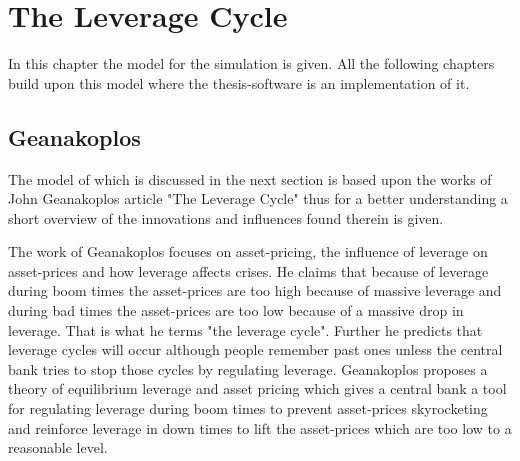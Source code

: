 \documentclass[../Bachelorarbeit.tex]{subfiles}
\begin{document}
\chapter{The Leverage Cycle}
\label{ch:leverageCycle}

In this chapter the model for the simulation is given. All the following chapters build upon this model where the thesis-software is an implementation of it. 

\section{Geanakoplos}
The model of \cite{Breuer2015} which is discussed in the next section is based upon the works of John Geanakoplos article \cite{Geanakoplos2009} "The Leverage Cycle" thus for a better understanding a short overview of the innovations and influences found therein is given.

\medskip

The work of Geanakoplos focuses on asset-pricing, the influence of leverage on asset-prices and how leverage affects crises. He claims that because of leverage during boom times the asset-prices are too high because of massive leverage and during bad times the asset-prices are too low because of a massive drop in leverage. That is what he terms "the leverage cycle". Further he predicts that leverage cycles will occur although people remember past ones unless the central bank tries to stop those cycles by regulating leverage. Geanakoplos proposes a theory of equilibrium leverage and asset pricing which gives a central bank a tool for regulating leverage during boom times to prevent asset-prices skyrocketing and reinforce leverage in down times to lift the asset-prices which are too low to a reasonable level.
\end{document}
